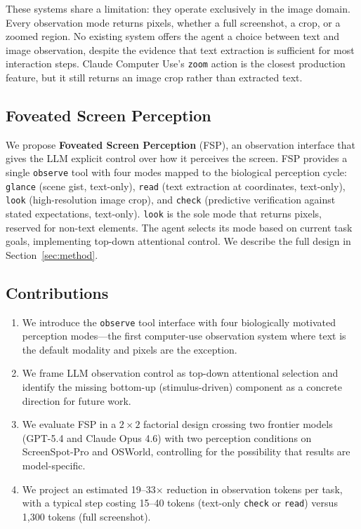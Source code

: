 \documentclass[11pt,a4paper]{article}
\begin{document}
These systems share a limitation: they operate exclusively in the image domain.
Every observation mode returns pixels, whether a full screenshot, a crop, or a zoomed region.
No existing system offers the agent a choice between text and image observation, despite the evidence that text extraction is sufficient for most interaction steps.
Claude Computer Use's \texttt{zoom} action \cite{claude-computer-use} is the closest production feature, but it still returns an image crop rather than extracted text.

\subsection{Foveated Screen Perception}
\label{sec:intro-fsp}

We propose \textbf{Foveated Screen Perception} (FSP), an observation interface that gives the LLM explicit control over how it perceives the screen.
FSP provides a single \texttt{observe} tool with four modes mapped to the biological perception cycle: \texttt{glance} (scene gist, text-only), \texttt{read} (text extraction at coordinates, text-only), \texttt{look} (high-resolution image crop), and \texttt{check} (predictive verification against stated expectations, text-only). \texttt{look} is the sole mode that returns pixels, reserved for non-text elements. The agent selects its mode based on current task goals, implementing top-down attentional control. We describe the full design in Section~\ref{sec:method}.

\subsection{Contributions}
\label{sec:intro-contributions}

\begin{enumerate}[leftmargin=*,itemsep=2pt]
\item We introduce the \texttt{observe} tool interface with four biologically motivated perception modes---the first computer-use observation system where text is the default modality and pixels are the exception.

\item We frame LLM observation control as top-down attentional selection and identify the missing bottom-up (stimulus-driven) component as a concrete direction for future work.

\item We evaluate FSP in a $2 \times 2$ factorial design crossing two frontier models (GPT-5.4 and Claude Opus 4.6) with two perception conditions on ScreenSpot-Pro and OSWorld, controlling for the possibility that results are model-specific.

\item We project an estimated 19--33$\times$ reduction in observation tokens per task, with a typical step costing 15--40 tokens (text-only \texttt{check} or \texttt{read}) versus 1{,}300 tokens (full screenshot).
\end{enumerate}
\end{document}
